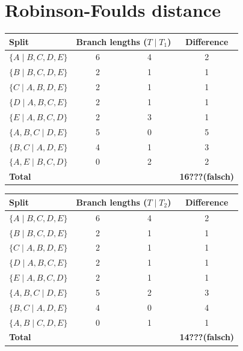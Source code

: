 \section{Robinson-Foulds distance}
\begin{table}[H]
\centering
\begin{tabular}{l|cc|c}
\textbf{Split} & \multicolumn{2}{c|}{\textbf{Branch lengths ($T \mid T_1$)}} & \textbf{Difference} \\
\hline
$\{A \mid B,C,D,E\}$ & 6 & 4 & 2 \\ 
$\{B \mid B,C,D,E\}$ & 2 & 1 & 1 \\
$\{C \mid A,B,D,E\}$ & 2 & 1 & 1 \\
$\{D \mid A,B,C,E\}$ & 2 & 1 & 1 \\
$\{E \mid A,B,C,D\}$ & 2 & 3 & 1 \\
$\{A,B,C \mid D,E\}$ & 5 & 0 & 5 \\
$\{B,C \mid A,D,E\}$ & 4 & 1 & 3 \\
$\{A,E \mid B,C,D\}$ & 0 & 2 & 2 \\
\hline
\textbf{Total} & & & \textbf{16???(falsch)} \\
\end{tabular}
\end{table}
\begin{table}[H]
\centering
\begin{tabular}{l|cc|c}
\textbf{Split} & \multicolumn{2}{c|}{\textbf{Branch lengths ($T \mid T_2$)}} & \textbf{Difference} \\
\hline
$\{A \mid B,C,D,E\}$ & 6 & 4 & 2 \\ 
$\{B \mid B,C,D,E\}$ & 2 & 1 & 1 \\
$\{C \mid A,B,D,E\}$ & 2 & 1 & 1 \\
$\{D \mid A,B,C,E\}$ & 2 & 1 & 1 \\
$\{E \mid A,B,C,D\}$ & 2 & 1 & 1 \\
$\{A,B,C \mid D,E\}$ & 5 & 2 & 3 \\
$\{B,C \mid A,D,E\}$ & 4 & 0 & 4 \\
$\{A,B \mid C,D,E\}$ & 0 & 1 & 1 \\
\hline
\textbf{Total} & & & \textbf{14???(falsch)} \\
\end{tabular}
\end{table}
